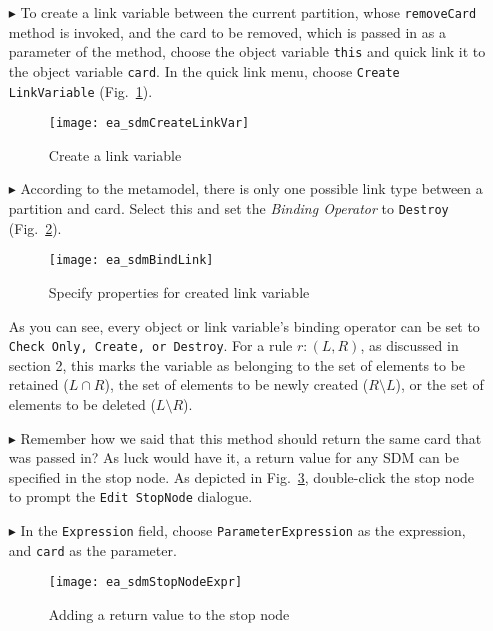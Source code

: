 \begin{itemize}

\item[$\blacktriangleright$] To create a link variable between the current partition, whose \texttt{removeCard} method is invoked, and the
card to be removed, which is passed in as a parameter of the method, choose the object variable \texttt{this} and quick link it to the object variable
\texttt{card}. In the quick link menu, choose \texttt{Create LinkVariable} (Fig.~\ref{fig:link_variable}).

\begin{figure}[htp]
\begin{center}
  \texttt{[image: ea\_sdmCreateLinkVar]}
  \caption{Create a link variable}   
  \label{fig:link_variable}
\end{center}
\end{figure}

\item[$\blacktriangleright$] According to the metamodel, there is only one possible link type between a partition and card. Select this and set the
\emph{Binding Operator} to \texttt{Destroy} (Fig.~\ref{fig:link_variable_properties}). 

\begin{figure}[htb]
\begin{center} 
 \texttt{[image: ea\_sdmBindLink]}
  \caption{Specify properties for created link variable}  
  \label{fig:link_variable_properties}
\end{center}
\end{figure}

As you can see, every object or link variable's binding operator can be set to \texttt{Check Only, Create, or Destroy}. For a rule $r: (L, R)$, as discussed in
section 2, this marks the variable as belonging to the set of elements to be retained ($L\cap R$), the set of elements to be newly created ($R\setminus L$), or
the set of elements to be deleted ($L\setminus R$).

\item[$\blacktriangleright$] Remember how we said that this method should return the same card that was passed in? As luck would have it, a return value for any
SDM can be specified in the stop node. As depicted in Fig.~\ref{fig:stop_node_return_value}, double-click the stop node to prompt the \texttt{Edit StopNode} dialogue. 

\item[$\blacktriangleright$] In the \texttt{Expression} field, choose \texttt{ParameterExpression} as the expression, and \texttt{card} as the parameter.

\begin{figure}[htb]
\begin{center}
  \texttt{[image: ea\_sdmStopNodeExpr]}
  \caption{Adding a return value to the stop node}  
  \label{fig:stop_node_return_value}
\end{center}
\end{figure}

\end{itemize}

